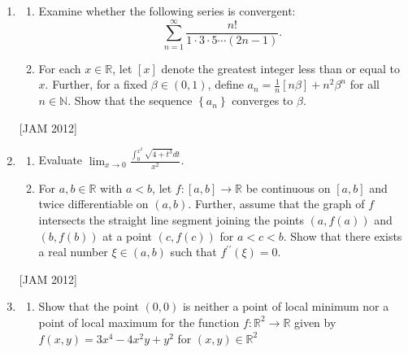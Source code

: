 \begin{enumerate}
\begin{enumerate}
    \item $-1$ 
\item 0 
\item 1 
\item 2
\end{enumerate}
\hfill [JAM 2012]







\item 

\begin{enumerate}
     \item Examine whether the following series is convergent:
$$
\sum_{n=1}^{\infty} \frac{n !}{1 \cdot 3 \cdot 5 \cdots(2 n-1)} \text {. }
$$
\item  For each $x \in \mathbb{R}$, let $[x]$ denote the greatest integer less than or equal to $x$. Further, for a fixed $\beta \in(0,1)$, define $a_{n}=\frac{1}{n}[n \beta]+n^{2} \beta^{n}$ for all $n \in \mathbb{N}$. Show that the sequence $\left\{a_{n}\right\}$ converges to $\beta$.
\end{enumerate}
\hfill [JAM 2012]




\item  


\begin{enumerate}
    \item Evaluate $\lim _{x \rightarrow 0} \frac{\int_{0}^{x^{2}} \sqrt{4+t^{3}} d t}{x^{2}}$.

\item For $a, b \in \mathbb{R}$ with $a<b$, let $f:[a, b] \rightarrow \mathbb{R}$ be continuous on $[a, b]$ and twice differentiable on $(a, b)$. Further, assume that the graph of $f$ intersects the straight line segment joining the points $(a, f(a))$ and $(b, f(b))$ at a point $(c, f(c))$ for $a<c<b$. Show that there exists a real number $\xi \in(a, b)$ such that $f^{\prime \prime}(\xi)=0$.

\end{enumerate}
\hfill [JAM 2012]




\item 


\begin{enumerate}
    \item Show that the point $(0,0)$ is neither a point of local minimum nor a point of local maximum for the function $f: \mathbb{R}^{2} \rightarrow \mathbb{R}$ given by $f(x, y)=3 x^{4}-4 x^{2} y+y^{2}$ for $(x, y) \in \mathbb{R}^{2}$


\end{enumerate}
\end{enumerate}
